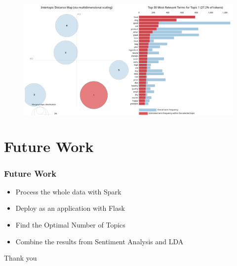 \documentclass{beamer}
\begin{document}
\begin{frame}
    \begin{figure}
        \includegraphics[width=\textwidth]{../figures/result_pet.png}
    \end{figure}
\end{frame}

\section{Future Work}

\begin{frame}
    \frametitle{Future Work}
    \centering
    \begin{itemize}
        \item Process the whole data with Spark
        \item Deploy as an application with Flask
        \item Find the Optimal Number of Topics
        \item Combine the results from Sentiment Analysis and LDA
    \end{itemize}
    \end{frame}

\begin{frame}
    \centering
    \LARGE{Thank you}
\end{frame}
\end{document}
